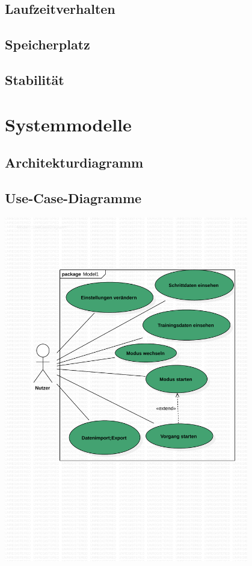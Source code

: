 \documentclass[a4paper,12pt]{article}
\begin{document}
\subsection{Laufzeitverhalten}
\subsection{Speicherplatz}
\subsection{Stabilität}

\section{Systemmodelle}
  \subsection{Architekturdiagramm}
  \subsection{Use-Case-Diagramme}
\begin{center}
\includegraphics[width=0.8\textwidth]{Vorlaeufiges Use-Case Diagram.pdf} %
\end{center}
\end{document}
